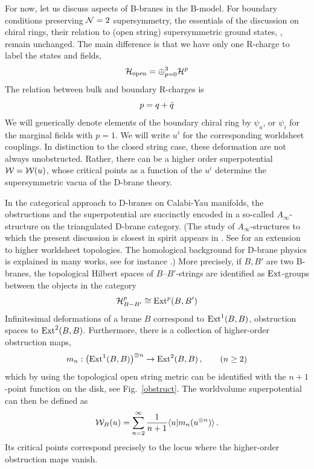 For now, let us discuss aspects of B-branes in the B-model. For
boundary conditions preserving ${\cal N}=2$ supersymmetry, the essentials
of the discussion on chiral rings, their relation to (open string)
supersymmetric ground states, \etc, remain unchanged. The main
difference is that we have only one R-charge to label the states
and fields,
\begin{equation}
\eqlabel{openhilbert}
\calh_{\rm open} = \oplus_{p=0}^3 \calh^p 
\end{equation}
The relation between bulk and boundary R-charges is
\begin{equation}
\eqlabel{relation}
p = q + \qb
\end{equation}
We will generically denote elements of the boundary chiral ring
by $\psi_a$, or $\psi_i$ for the marginal fields with $p=1$. We
will write $u^i$ for the corresponding worldsheet couplings. In 
distinction to the closed string case, these deformation are not 
always unobstructed. Rather, there can be a higher order superpotential
${\cal W}={\cal W}(u)$, whose critical points as a function of the $u^i$ 
determine the supersymmetric vacua of the D-brane theory. 

In the categorical approach to D-branes on Calabi-Yau manifolds, 
the obstructions and the superpotential are succinctly encoded in 
a so-called $A_\infty$-structure on the triangulated D-brane category. 
(The study of $A_\infty$-structures to which the present discussion is
closest in spirit appears in \cite{hll}. See \cite{herbst} for
an extension to higher worldsheet topologies. The homological background 
for D-brane physics is explained in many works, see for instance
\cite{sharpe,dougcat,calinreview,sharpereview}.)
More precisely, if $B, B'$ are two B-branes, the topological Hilbert 
spaces of $B$--$B'$-strings are identified as ${\rm Ext}$-groups 
between the objects in the category
\begin{equation}
{\cal H}^p_{B-B'} \cong {\rm Ext}^p(B,B')
\end{equation}
Infinitesimal deformations of a brane $B$ correspond to 
${\rm Ext}^1(B,B)$, obstruction spaces to ${\rm Ext}^2(B,B)$. Furthermore,
there is a collection of higher-order obstruction maps,
\begin{equation}
\eqlabel{mn}
m_n : \bigl({\rm Ext}^1(B,B)\bigr)^{\otimes n} \to {\rm Ext}^2(B,B)
\,,\qquad (n\ge 2)
\end{equation}
which by using the topological open string metric can be identified
with the $n+1$-point function on the disk, see Fig.\ \ref{obstruct}.
The worldvolume superpotential can then be defined as \cite{calin}
\begin{equation}
\eqlabel{supo}
\calw_B(u) = \sum_{n=2}^\infty \frac 1{n+1}\langle u|m_n(u^{\otimes n})\rangle\,.
\end{equation}
Its critical points correspond precisely to the locus where the 
higher-order obstruction maps vanish.

